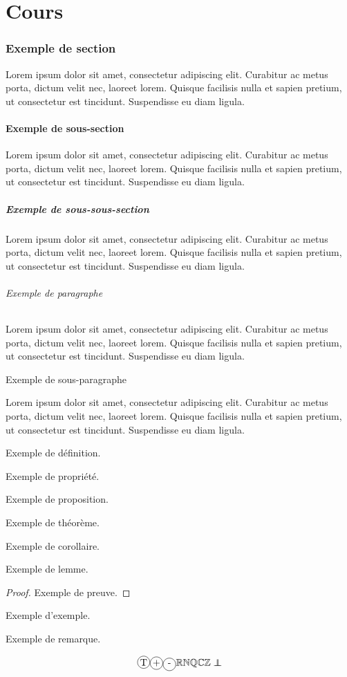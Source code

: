 \part{Cours}

\newcommand{\lorem}{Lorem ipsum dolor sit amet, consectetur adipiscing elit. Curabitur ac metus porta, dictum velit nec, laoreet lorem. Quisque facilisis nulla et sapien pretium, ut consectetur est tincidunt. Suspendisse eu diam ligula.}

\section{Exemple de section}
\lorem

\subsection{Exemple de sous-section}
\lorem
\subsubsection{Exemple de sous-sous-section}
\lorem
\paragraph{Exemple de paragraphe}
\lorem
\subparagraph{Exemple de sous-paragraphe}
\lorem

\begin{definition}
    Exemple de définition.
\end{definition}

\begin{propriety}
    Exemple de propriété.
\end{propriety}

\begin{proposition}
    Exemple de proposition.
\end{proposition}

\begin{theorem}
    Exemple de théorème.
\end{theorem}

\begin{corollary}
    Exemple de corollaire.
\end{corollary}

\begin{lemma}
    Exemple de lemme.
\end{lemma}

\begin{proof}
    Exemple de preuve.
\end{proof}

\begin{example}
    Exemple d'exemple.
\end{example}

\begin{remark}
    Exemple de remarque.
\end{remark}

$$\circled{T} \cplus \cminus \R \N \Q \C \Z \independant$$
